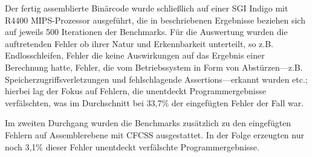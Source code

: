 \documentclass[11pt]{article}
\begin{document}
Der fertig assemblierte Binärcode wurde schließlich auf einer SGI Indigo mit
R4400 MIPS-Prozessor ausgeführt, die in \cite{oh-2002-control} beschriebenen
Ergebnisse beziehen sich auf jeweils 500 Iterationen der Benchmarks. Für die
Auswertung wurden die auftretenden Fehler ob ihrer Natur und Erkennbarkeit
unterteilt, so z.B. Endlosschleifen, Fehler die keine Auswirkungen auf das
Ergebnis einer Berechnung hatte, Fehler, die vom Betriebssystem in Form von
Abstürzen—z.B. Speicherzugriffsverletzungen und fehlschlagende
Assertions—erkannt wurden etc.; hierbei lag der Fokus auf Fehlern, die
unentdeckt Programmergebnisse verfälschten, was im Durchschnitt bei 33,7\% der
eingefügten Fehler der Fall war.

Im zweiten Durchgang wurden die Benchmarks zusätzlich zu den eingefügten
Fehlern auf Assemblerebene mit CFCSS ausgestattet. In der Folge erzeugten nur
noch 3,1\% dieser Fehler unentdeckt verfälschte Programmergebnisse.



\pagebreak


\end{document}
